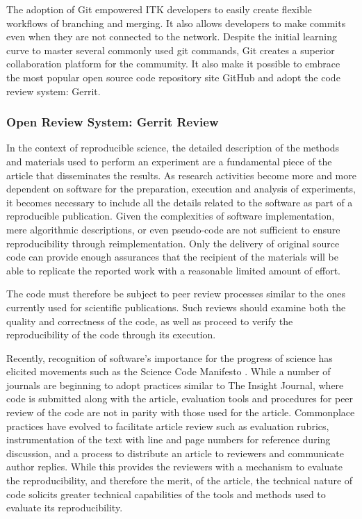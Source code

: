 \documentclass{frontiersENG} %
\begin{document}
The adoption of Git empowered ITK developers to easily create flexible
workflows of branching and merging. It also allows developers to
make commits even when they are not connected to the network. Despite the
initial learning curve to master several commonly used git commands, Git creates
a superior collaboration platform for the commumity.  It also make it possible
to embrace the most popular open source code repository site GitHub and adopt
the code review system: Gerrit.


\subsubsection{Open Review System: Gerrit Review} In the context of
reproducible science, the detailed description of the methods and materials
used to perform an experiment are a fundamental piece of the article that
disseminates the results. As research activities become more and more dependent
on software for the preparation, execution and analysis of experiments, it
becomes necessary to include all the details related to the software as part of
a reproducible publication. Given the complexities of software implementation,
mere algorithmic descriptions, or even pseudo-code are not sufficient to ensure
reproducibility through reimplementation. Only the delivery of original source
code can provide enough assurances that the recipient of the materials will be
able to replicate the reported work with a reasonable limited amount of effort.

The code must therefore be subject to peer review processes similar to the ones
currently used for scientific publications. Such reviews should examine both
the quality and correctness of the code, as well as proceed to verify the
reproducibility of the code through its execution.

Recently, recognition of software’s importance for the progress of science has
elicited movements such as the Science Code Manifesto \cite{Barnes2011}. While
a number of journals are beginning to adopt practices similar to The Insight
Journal, where code is submitted along with the article, evaluation tools and
procedures for peer review of the code are not in parity with those used for
the article.  Commonplace practices have evolved to facilitate article review
such as evaluation rubrics, instrumentation of the text with line and page
numbers for reference during discussion, and a process to distribute an article
to reviewers and communicate author replies.  While this provides the reviewers
with a mechanism to evaluate the reproducibility, and therefore the merit, of
the article, the technical nature of code solicits greater technical
capabilities of the tools and methods used to evaluate its reproducibility.
\end{document}
